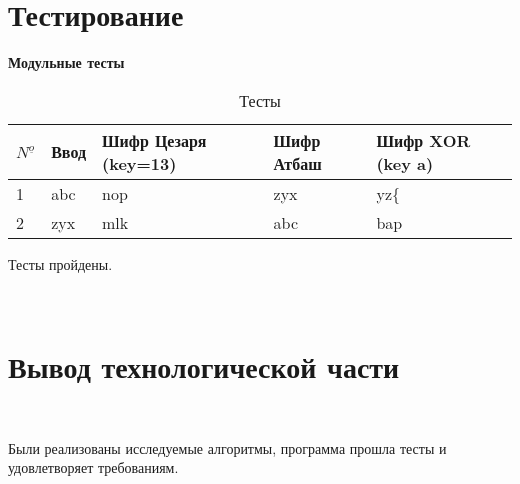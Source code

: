 \section{Тестирование}\label{TestResult}


\textbf{Модульные тесты}

\begin{table}[ht]
    \caption{Тесты}
    \centering
\begin{tabular}{ l | l | l | l | l |}
    ${N^{\underline{o}}}$ & Ввод & Шифр Цезаря (key=13)&  Шифр Атбаш &  Шифр XOR (key a) \\ \hline \hline
    1 & abc & nop & zyx & yz\{ \\  \hline 
    2 & zyx & mlk & abc & bap \\  \hline 
\end{tabular}
\label{tab:matrixMultiply}
\end{table}

Тесты пройдены.

~\section{Вывод технологической части}\label{TechResults}~

Были реализованы исследуемые алгоритмы, программа прошла тесты и удовлетворяет требованиям.

